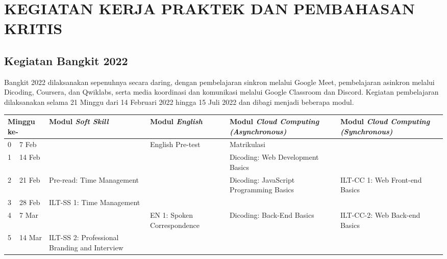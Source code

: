 \chapter{KEGIATAN KERJA PRAKTEK DAN PEMBAHASAN KRITIS}
\section{Kegiatan Bangkit 2022}
Bangkit 2022 dilaksanakan sepenuhnya secara daring, dengan pembelajaran sinkron melalui Google Meet, pembelajaran asinkron melalui Dicoding, Coursera, dan Qwiklabs, serta media koordinasi dan komunikasi melalui Google Classroom dan Discord. Kegiatan pembelajaran dilaksanakan selama 21 Minggu dari 14 Februari 2022 hingga 15 Juli 2022 dan dibagi menjadi beberapa modul.

\begin{longtable}{|p{2cm}p{2cm}|p{2cm}p{2cm}p{2cm}p{2cm}|}
	\hline
	\multicolumn{2}{|p{1cm}|}{Minggu ke-} &
	\multicolumn{1}{p{2cm}|}{Modul \textit{Soft Skill}} &
	\multicolumn{1}{p{2cm}|}{Modul \textit{English}} &
	\multicolumn{1}{p{2cm}|}{Modul \textit{Cloud Computing (Asynchronous)}} &
	Modul \textit{Cloud Computing (Synchronous)} \\ \hline
	\endfirsthead
	\endhead
	\multicolumn{1}{|p{1cm}|}{0} &
	7 Feb &
	\multicolumn{1}{p{2cm}|}{} &
	\multicolumn{1}{p{2cm}|}{English Pre-test} &
	\multicolumn{1}{p{2cm}|}{Matrikulasi} &
	\\ \hline
	\multicolumn{1}{|p{1cm}|}{1} &
	14 Feb &
	\multicolumn{1}{p{2cm}|}{} &
	\multicolumn{1}{p{2cm}|}{} &
	\multicolumn{1}{p{2cm}|}{Dicoding: Web Development Basics} &
	\\ \hline
	\multicolumn{1}{|p{1cm}|}{2} &
	21 Feb &
	\multicolumn{1}{p{2cm}|}{Pre-read: Time Management} &
	\multicolumn{1}{p{2cm}|}{} &
	\multicolumn{1}{p{2cm}|}{\multirow{2}{2cm}{Dicoding: JavaScript Programming Basics}} &
	ILT-CC 1: Web Front-end Basics \\ \cline{1-4} \cline{6-6} 
	\multicolumn{1}{|p{1cm}|}{3} &
	28 Feb &
	\multicolumn{1}{p{2cm}|}{ILT-SS 1: Time Management} &
	\multicolumn{1}{p{2cm}|}{} &
	\multicolumn{1}{p{2cm}|}{} &
	\\ \hline
	\multicolumn{1}{|p{1cm}|}{4} &
	7 Mar &
	\multicolumn{1}{p{2cm}|}{} &
	\multicolumn{1}{p{2cm}|}{EN 1: Spoken Correspondence} &
	\multicolumn{1}{p{2cm}|}{Dicoding: Back-End Basics} &
	ILT-CC-2: Web Back-end Basics \\ \hline
	\multicolumn{1}{|p{1cm}|}{5} &
	14 Mar &
	\multicolumn{1}{p{2cm}|}{ILT-SS 2: Professional Branding and Interview} &

\end{longtable}
